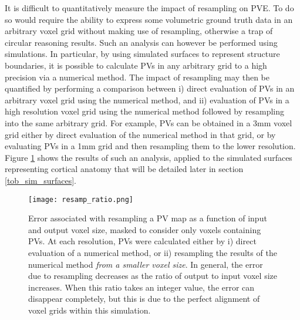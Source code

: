 It is difficult to quantitatively measure the impact of resampling on PVE. To do so would require the ability to express some volumetric ground truth data in an arbitrary voxel grid without making use of resampling, otherwise a trap of circular reasoning results. Such an analysis can however be performed using simulations. In particular, by using simulated surfaces to represent structure boundaries, it is possible to calculate PVs in any arbitrary grid to a high precision via a numerical method. The impact of resampling may then be quantified by performing a comparison between i) direct evaluation of PVs in an arbitrary voxel grid using the numerical method, and ii) evaluation of PVs in a high resolution voxel grid using the numerical method followed by resampling into the same arbitrary grid. For example, PVs can be obtained in a 3mm voxel grid either by direct evaluation of the numerical method in that grid, or by evaluating PVs in a 1mm grid and then resampling them to the lower resolution. Figure \ref{resamp_ratio} shows the results of such an analysis, applied to the simulated surfaces representing cortical anatomy that will be detailed later in section \ref{tob_sim_surfaces}. 

\begin{figure}
\centering
\texttt{[image: resamp\_ratio.png]}
\caption{Error associated with resampling a PV map as a function of input and output voxel size, masked to consider only voxels containing PVs. At each resolution, PVs were calculated either by i) direct evaluation of a numerical method, or ii) resampling the results of the numerical method \textit{from a smaller voxel size}. In general, the error due to resampling decreases as the ratio of output to input voxel size increases. When this ratio takes an integer value, the error can disappear completely, but this is due to the perfect alignment of voxel grids within this simulation.}
\label{resamp_ratio}
\end{figure}

